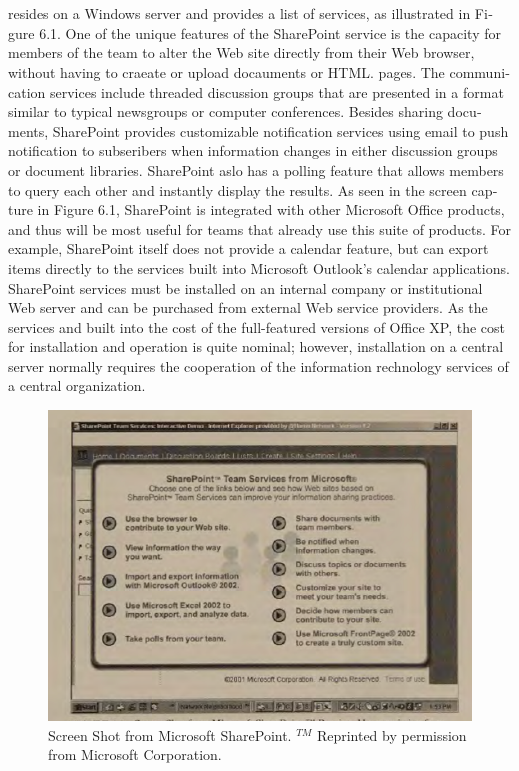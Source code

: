 \chapter{}
\begin{latin}
resides on a Windows server and provides a list of services, as illustrated in Figure 6.1. One of the unique features of the SharePoint service is the capacity for members of the team to alter the Web site directly from their Web browser, without having to craeate or upload docauments or HTML. pages. The communication services include threaded discussion groups that are presented in a format similar to typical newsgroups or computer conferences. Besides sharing documents, SharePoint provides customizable notification services using email to push notification to subseribers when information changes in either discussion groups or document libraries. 
SharePoint aslo has a polling feature that  allows members to query each other and instantly display the results. As seen in the screen capture in Figure 6.1, SharePoint is integrated with other Microsoft Office products, and thus will be most useful for teams that already use this suite of products. For example, SharePoint itself does not provide a  calendar feature, but can export items directly to the services built into Microsoft Outlook's calendar applications. SharePoint services must be installed on an internal company or institutional Web server and can  be purchased from external Web service providers. As the services and built into the cost of  the full-featured versions of Office XP, the cost for installation and operation is quite nominal; however, installation on a central server normally requires the cooperation of the information rechnology services of a central organization.
\begin{figure}[H]
\centering
 \includegraphics*[scale=1]{1}
\caption{ Screen Shot from Microsoft SharePoint. ${}^{TM}$ Reprinted by permission from Microsoft Corporation.}
\end{figure}

\end{latin}
